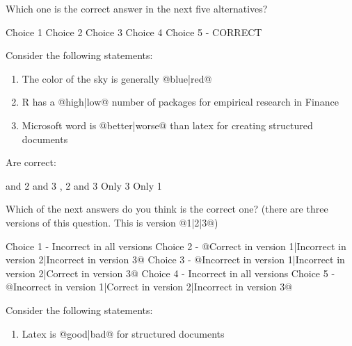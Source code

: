 \documentclass[10pt, answers]{exam}
\begin{document}
\vspace{1cm}

\begin{questions}
	
\question 

	Which one is the correct answer in the next five alternatives?
	
	\begin{choices}
	\choice Choice 1
	\choice Choice 2
	\choice Choice 3
	\choice Choice 4
	\CorrectChoice Choice 5 - CORRECT
	\end{choices}
		
	
\question 
	
	Consider the following statements:
	
	\begin{enumerate}%
		\item The color of the sky is generally @{blue}|{red}@		
		\item R has a @{high}|{low}@ number of packages for empirical research in Finance		
		\item Microsoft word is @{better}|{worse}@ than latex for creating structured documents
	\end{enumerate}
	
	Are correct:
	
	\begin{choices}	
	 and 2
	 and 3
	, 2 and 3
	\choice [2] Only 3
	\choice Only 1 
	\end{choices}	

\question 

	Which of the next answers do you think is the correct one? (there are three versions of this question. This is version @{1}|{2}|{3}@)
	
	\begin{choices}	
	\choice Choice 1 - Incorrect in all versions
	\choice [1] Choice 2 - @{Correct in version 1}|{Incorrect in version 2}|{Incorrect in version 3}@ 
	\choice [3] Choice 3 - @{Incorrect in version 1}|{Incorrect in version 2}|{Correct in version 3}@
	\choice Choice 4 - Incorrect in all versions
	\choice [2] Choice 5 - @{Incorrect in version 1}|{Correct in version 2}|{Incorrect in version 3}@
	\end{choices}	


\question 

	Consider the following statements:
	
	\begin{enumerate}%
		\item Latex is @{good}|{bad}@ for structured documents
		

\end{enumerate}
\end{questions}
\end{document}
